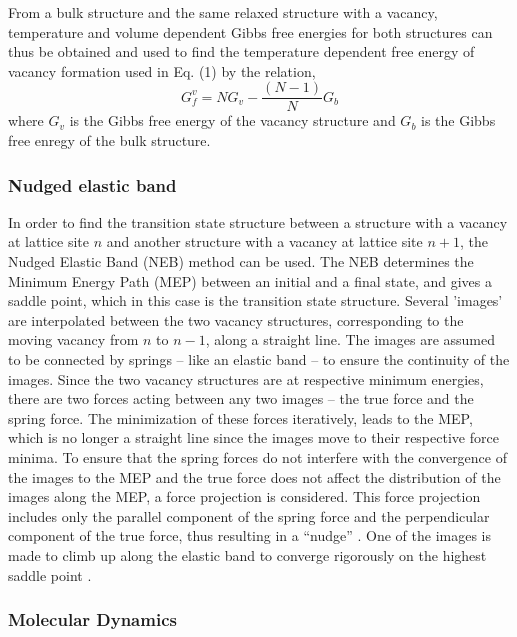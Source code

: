 \documentclass{article}
\begin{document}
From a bulk structure and the same relaxed structure with a vacancy, temperature and volume dependent Gibbs free energies for both structures can thus be obtained and used to find the temperature dependent free energy of vacancy formation used in Eq. (1) by the relation,
%
\begin{equation}
G^v_f = N G_v - \dfrac{(N - 1)}{N} G_b
\end{equation}
%
where $G_v$ is the Gibbs free energy of the vacancy structure and $G_b$ is the Gibbs free enregy of the bulk structure.

\subsubsection*{Nudged elastic band}

In order to find the transition state structure between a structure with a vacancy at lattice site $n$ and another structure with a vacancy at lattice site $n+1$,  the Nudged Elastic Band (NEB) method can be used. The NEB determines the Minimum Energy Path (MEP) between an initial and a final state, and gives a saddle point, which in this case is the transition state structure. Several 'images' are interpolated between the two vacancy structures, corresponding to the moving vacancy from $n$ to $n-1$, along a straight line. The images are assumed to be connected by springs – like an elastic band – to ensure the continuity of the images. Since the two vacancy structures are at respective minimum energies, there are two forces acting between any two images – the true force and the spring force. The minimization of these forces iteratively, leads to the MEP, which is no longer a straight line since the images move to their respective force minima. To ensure that the spring forces do not interfere with the convergence of the images to the MEP and the true force does not affect the distribution of the images along the MEP, a force projection is considered. This force projection includes only the parallel component of the spring force and the perpendicular component of the true force, thus resulting in a “nudge” \cite{Henkelman2000}. One of the images is made to climb up along the elastic band to converge rigorously on the highest saddle point \cite{Henkelman2000a}. 








\subsubsection{Molecular Dynamics}
\end{document}
